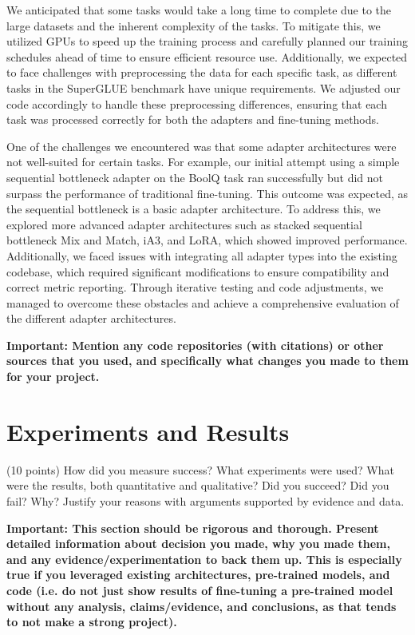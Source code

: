 \documentclass[10pt,twocolumn,letterpaper]{article}
\begin{document}
We anticipated that some tasks would take a long time to complete due to the large datasets and the inherent complexity of the tasks. To mitigate this, we utilized GPUs to speed up the training process and carefully planned our training schedules ahead of time to ensure efficient resource use. Additionally, we expected to face challenges with preprocessing the data for each specific task, as different tasks in the SuperGLUE benchmark have unique requirements. We adjusted our code accordingly to handle these preprocessing differences, ensuring that each task was processed correctly for both the adapters and fine-tuning methods.

One of the challenges we encountered was that some adapter architectures were not well-suited for certain tasks. For example, our initial attempt using a simple sequential bottleneck adapter on the BoolQ task ran successfully but did not surpass the performance of traditional fine-tuning. This outcome was expected, as the sequential bottleneck is a basic adapter architecture. To address this, we explored more advanced adapter architectures such as stacked sequential bottleneck Mix and Match, iA3, and LoRA, which showed improved performance. Additionally, we faced issues with integrating all adapter types into the existing codebase, which required significant modifications to ensure compatibility and correct metric reporting. Through iterative testing and code adjustments, we managed to overcome these obstacles and achieve a comprehensive evaluation of the different adapter architectures.


\textbf{Important: Mention any code repositories (with citations) or other sources that you used, and specifically what changes you made to them for your project. }

\section{Experiments and Results}

(10 points) How did you measure success? What experiments were used? What were the results, both quantitative and qualitative? Did you succeed? Did you fail? Why? Justify your reasons with arguments supported by evidence and data.

\textbf{Important: This section should be rigorous and thorough. Present detailed information about decision you made, why you made them, and any evidence/experimentation to back them up. This is especially true if you leveraged existing architectures, pre-trained models, and code (i.e. do not just show results of fine-tuning a pre-trained model without any analysis, claims/evidence, and conclusions, as that tends to not make a strong project). }
\end{document}
